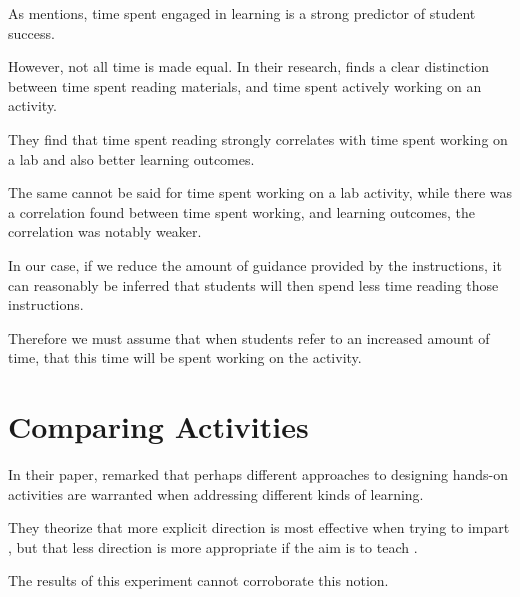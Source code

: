 As \textcite{C-Linehan} mentions, time spent engaged in learning is a strong predictor of student success. %



However, not all time is made equal. In their research, \textcite{Z-Zeng} finds a clear distinction between time spent reading materials, and time spent actively working on an activity. %



They find that time spent reading strongly correlates with time spent working on a lab and also better learning outcomes. %



The same cannot be said for time spent working on a lab activity, while there was a correlation found between time spent working, and learning outcomes, the correlation was notably weaker. 



    



    In our case, if we reduce the amount of guidance provided by the instructions, it can reasonably be inferred that students will then spend less time reading those instructions. %



Therefore we must assume that when students refer to an increased amount of time, that this time will be spent working on the activity. 











\section{Comparing Activities}



    In their paper, \citeauthor{R-Weiss} remarked that perhaps different approaches to designing hands-on activities are warranted when addressing different kinds of learning. %



They theorize that more explicit direction is most effective when trying to impart , but that less direction is more appropriate if the aim is to teach . %



The results of this experiment cannot corroborate this notion. %



